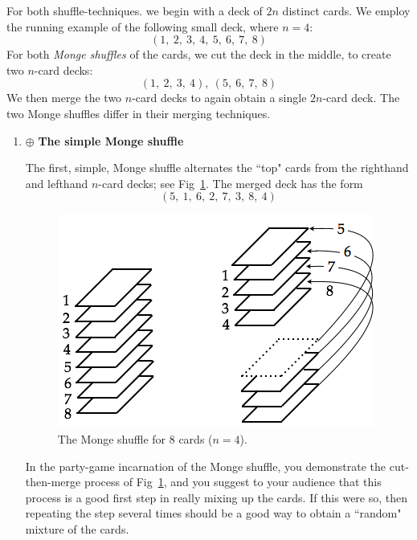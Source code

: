 \begin{enumerate}
\smallskip

For both shuffle-techniques. we begin with a deck of $2n$ distinct cards.  We employ the running example of the following small deck, where $n=4$:
\[ (1, \ 2, \ 3, \ 4, \ 5, \ 6, \ 7, \ 8) \]
For both {\it Monge shuffles} of the cards, we cut the deck in the middle, to create two $n$-card decks:
\[ (1, \ 2, \ 3, \ 4), \ (5, \ 6, \ 7, \ 8) \]
We then merge the two $n$-card decks to again obtain a single $2n$-card deck.  The two Monge shuffles differ in their merging techniques.

  \begin{enumerate}
  \item $\oplus$ {\bf The simple Monge shuffle}

\smallskip

The first, simple, Monge shuffle alternates the ``top" cards from the righthand and lefthand $n$-card decks; see Fig~\ref{fig:suffleMonge}.  The merged deck has the form
\[ (5, \ 1, \ 6, \ 2, \ 7, \ 3, \ 8, \ 4) \]
\begin{figure}[h]
\begin{center}
        \includegraphics[scale=0.4]{FiguresArithmetic/suffleMongeBasic}
        \caption{The Monge shuffle for $8$ cards ($n=4$).}
        \label{fig:suffleMonge}
\end{center}
\end{figure}

In the party-game incarnation of the Monge shuffle, you demonstrate the cut-then-merge process of Fig~\ref{fig:suffleMonge}, and you suggest to your audience that this process is a good first step in really mixing up the cards.  If this were so, then repeating the step several times should be a good way to obtain a ``random" mixture of the cards.

\smallskip


\end{enumerate}
\end{enumerate}
